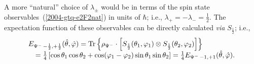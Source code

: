 {A more ``natural'' choice of $\lambda_\pm$ would be in terms of the spin state observables~(\ref{2004-gtq-e2F2nat}) in units of $\hbar$;
i.e., $  \lambda_+ = -  \lambda_- =\frac{1}{2}$.
The expectation function of  these observables can be directly calculated {\it via} $S_{\frac{1}{2}}$; i.e.,
\begin{equation}
\begin{array}{l}
E_{{ {\Psi^-}}\,-\frac{1}{2},+ \frac{1}{2} } ({\hat \theta},{\hat \varphi} )=
{\rm Tr}\left\{ \rho_{ {\Psi^-}} \cdot \left[ S_{\frac{1}{2}}(\theta_1,\varphi_1) \otimes S_{\frac{1}{2}}(\theta_2,\varphi_2)\right]\right\} \\
\quad =
\frac{1}{4} \left[\cos
    \theta_1  \cos  \theta_2 +\cos ( \varphi_1 - \varphi_2 ) \sin \theta_1  \sin  \theta_2 \right]
= \frac{1}{4}E_{{ {\Psi^-}}\,-1 ,+1 } ({\hat \theta},{\hat \varphi} )
.
\label{2009-gtq-sso2}
\end{array}
\end{equation}


\eexample
}


